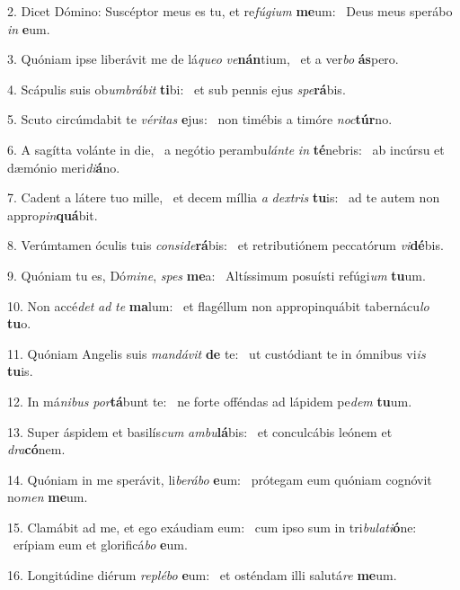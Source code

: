 2. Dicet Dómino: Suscéptor meus es tu, et re\textit{fú}\textit{gi}\textit{um} \textbf{me}um: \ast\  Deus meus sperábo \textit{in} \textbf{e}um.\

3. Quóniam ipse liberávit me de lá\textit{que}\textit{o} \textit{ve}\textbf{nán}tium, \ast\  et a ver\textit{bo} \textbf{ás}pero.\

4. Scápulis suis ob\textit{um}\textit{brá}\textit{bit} \textbf{ti}bi: \ast\  et sub pennis ejus \textit{spe}\textbf{rá}bis.\

5. Scuto circúmdabit te \textit{vé}\textit{ri}\textit{tas} \textbf{e}jus: \ast\  non timébis a timóre \textit{noc}\textbf{túr}no.\

6. A sagítta volánte in die, \dag\  a negótio perambu\textit{lán}\textit{te} \textit{in} \textbf{té}nebris: \ast\  ab incúrsu et dæmónio meri\textit{di}\textbf{á}no.\

7. Cadent a látere tuo mille, \dag\  et decem míllia \textit{a} \textit{dex}\textit{tris} \textbf{tu}is: \ast\  ad te autem non appro\textit{pin}\textbf{quá}bit.\

8. Verúmtamen óculis tuis \textit{con}\textit{si}\textit{de}\textbf{rá}bis: \ast\  et retributiónem peccatórum \textit{vi}\textbf{dé}bis.\

9. Quóniam tu es, Dó\textit{mi}\textit{ne}, \textit{spes} \textbf{me}a: \ast\  Altíssimum posuísti refúgi\textit{um} \textbf{tu}um.\

10. Non accé\textit{det} \textit{ad} \textit{te} \textbf{ma}lum: \ast\  et flagéllum non appropinquábit tabernácu\textit{lo} \textbf{tu}o.\

11. Quóniam Angelis suis \textit{man}\textit{dá}\textit{vit} \textbf{de} te: \ast\  ut custódiant te in ómnibus vi\textit{is} \textbf{tu}is.\

12. In má\textit{ni}\textit{bus} \textit{por}\textbf{tá}bunt te: \ast\  ne forte offéndas ad lápidem pe\textit{dem} \textbf{tu}um.\

13. Super áspidem et basilís\textit{cum} \textit{am}\textit{bu}\textbf{lá}bis: \ast\  et conculcábis leónem et \textit{dra}\textbf{có}nem.\

14. Quóniam in me sperávit, li\textit{be}\textit{rá}\textit{bo} \textbf{e}um: \ast\  prótegam eum quóniam cognóvit no\textit{men} \textbf{me}um.\

15. Clamábit ad me, et ego exáudiam eum: \dag\  cum ipso sum in tri\textit{bu}\textit{la}\textit{ti}\textbf{ó}ne: \ast\  erípiam eum et glorificá\textit{bo} \textbf{e}um.\

16. Longitúdine diérum \textit{re}\textit{plé}\textit{bo} \textbf{e}um: \ast\  et osténdam illi salutá\textit{re} \textbf{me}um.\

